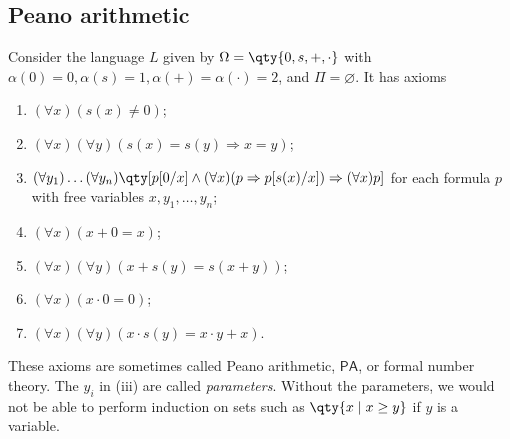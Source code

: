\subsection{Peano arithmetic}
Consider the language \( L \) given by \( \Omega = \qty{0, s, +, \cdot} \) with \( \alpha(0) = 0, \alpha(s) = 1, \alpha(+) = \alpha(\cdot) = 2 \), and \( \Pi = \varnothing \).
It has axioms
\begin{enumerate}
    \item \( (\forall x)(s(x) \neq 0) \);
    \item \( (\forall x)(\forall y)(s(x) = s(y) \Rightarrow x = y) \);
    \item \( (\forall y_1)\dots(\forall y_n)\qty[p[0/x] \wedge (\forall x)(p \Rightarrow p[s(x)/x]) \Rightarrow (\forall x)p] \) for each formula \( p \) with free variables \( x, y_1, \dots, y_n \);
    \item \( (\forall x)(x + 0 = x) \);
    \item \( (\forall x)(\forall y)(x + s(y) = s(x + y)) \);
    \item \( (\forall x)(x \cdot 0 = 0) \);
    \item \( (\forall x)(\forall y)(x \cdot s(y) = x \cdot y + x) \).
\end{enumerate}
These axioms are sometimes called Peano arithmetic, \( \mathsf{PA} \), or formal number theory.
The \( y_i \) in (iii) are called \emph{parameters}.
Without the parameters, we would not be able to perform induction on sets such as \( \qty{x \mid x \geq y} \) if \( y \) is a variable.

